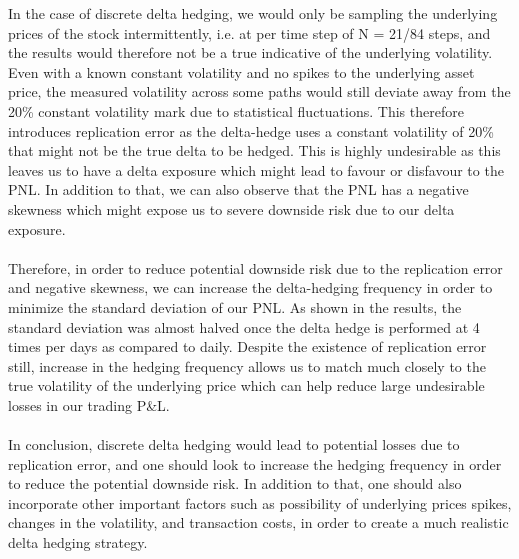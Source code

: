 \documentclass{article}
\begin{document}
\noindent In the case of discrete delta hedging, we would only be sampling the underlying prices of the stock intermittently, i.e. at per time step of N = 21/84 steps, and the results would therefore not be a true indicative of the underlying volatility. Even with a known constant volatility and no spikes to the underlying asset price, the measured volatility across some paths would still deviate away from the 20\% constant volatility mark due to statistical fluctuations.  This therefore introduces replication error as the delta-hedge uses a constant volatility of 20\% that might not be the true delta to be hedged. This is highly undesirable as this leaves us to have a delta exposure which might lead to favour or disfavour to the PNL.  In addition to that, we can also observe that the PNL has a negative skewness which might expose us to severe downside risk due to our delta exposure. \\ \\

\noindent Therefore, in order to reduce potential downside risk due to the replication error and negative skewness, we can increase the delta-hedging frequency in order to minimize the standard deviation of our PNL. As shown in the results, the standard deviation was almost halved once the delta hedge is performed at 4 times per days as compared to daily. Despite the existence of replication error still, increase in the hedging frequency allows us to match much closely to the true volatility of the underlying price which can help reduce large undesirable losses in our trading P\&L. \\ \\

\noindent In conclusion, discrete delta hedging would lead to potential losses due to replication error, and one should look to increase the hedging frequency in order to reduce the potential downside risk. In addition to that, one should also incorporate other important factors such as possibility of underlying prices spikes, changes in the volatility, and transaction costs, in order to create a much realistic delta hedging strategy. 
\end{document}
